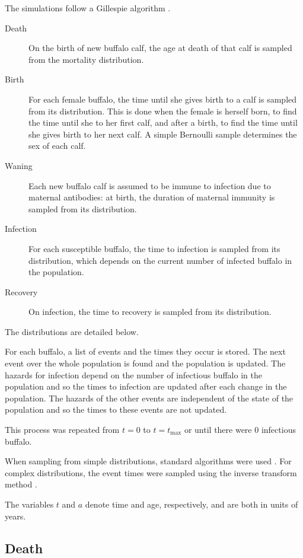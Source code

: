 \documentclass{jpmarticle}
\begin{document}
The simulations follow a Gillespie algorithm \citep{gillespie_1977}.
\begin{description}
\item[Death] On the birth of new buffalo calf, the age at death of
  that calf is sampled from the mortality distribution.

\item[Birth] For each female buffalo, the time until she gives birth
  to a calf is sampled from its distribution.  This is done when the
  female is herself born, to find the time until she to her first
  calf, and after a birth, to find the time until she gives birth to
  her next calf.  A simple Bernoulli sample determines the sex of each
  calf.

\item[Waning] Each new buffalo calf is assumed to be immune to
  infection due to maternal antibodies: at birth, the duration of
  maternal immunity is sampled from its distribution.

\item[Infection] For each susceptible buffalo, the time to infection
  is sampled from its distribution, which depends on the current
  number of infected buffalo in the population.

\item[Recovery] On infection, the time to recovery is sampled from its
  distribution.
\end{description}
The distributions are detailed below.

For each buffalo, a list of events and the times they occur is stored.
The next event over the whole population is found and the population
is updated.  The hazards for infection depend on the number of
infectious buffalo in the population and so the times to infection are
updated after each change in the population.  The hazards of the other
events are independent of the state of the population and so the times
to these events are not updated.

This process was repeated from $t = 0$ to $t = t_{\text{max}}$ or
until there were $0$ infectious buffalo.

When sampling from simple distributions, standard algorithms were used
\citep{scipy}.  For complex distributions, the event times were
sampled using the inverse transform method \citep{rubinstein_1981}.

The variables $t$ and $a$ denote time and age, respectively, and are
both in units of years.

\subsection{Death}
\end{document}
